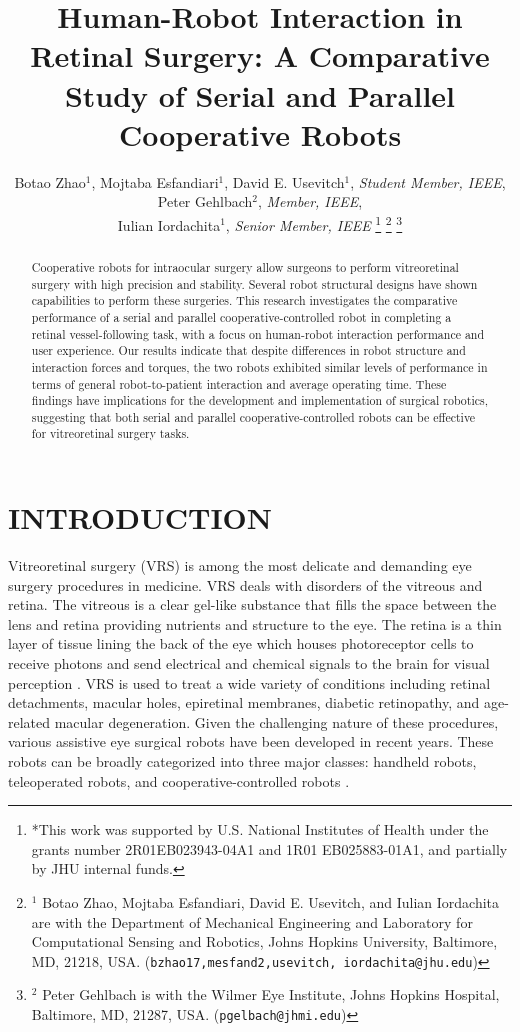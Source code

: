 \documentclass[letterpaper, 10 pt, conference]{ieeeconf}  %
\title{\LARGE \bf
Human-Robot Interaction in Retinal Surgery: A Comparative Study of Serial and Parallel Cooperative Robots
}
\author{Botao Zhao$^{1}$, 
Mojtaba Esfandiari$^{1}$,
David E. Usevitch$^{1}$, {\it Student Member, IEEE}, 
Peter Gehlbach$^{2}$, {\it Member, IEEE},  
\\Iulian Iordachita$^{1}$, {\it Senior Member, IEEE}%
\thanks{*This work was supported by U.S. National Institutes of Health under the grants number 2R01EB023943-04A1 and 1R01 EB025883-01A1, and partially by JHU internal funds.}%
\thanks{$^{1}$ Botao Zhao, Mojtaba Esfandiari, David E. Usevitch, and Iulian Iordachita are with the Department of Mechanical Engineering and Laboratory for Computational Sensing and Robotics, Johns Hopkins University,
Baltimore, MD, 21218, USA. 
        ({\tt\small bzhao17,mesfand2,usevitch, iordachita@jhu.edu})}%
\thanks{$^{2}$ Peter Gehlbach is with the Wilmer Eye Institute, Johns Hopkins Hospital, Baltimore, MD, 21287, USA. ({\tt\small pgelbach@jhmi.edu})
}
}
\begin{document}
\maketitle
\thispagestyle{empty}
\pagestyle{empty}


\begin{abstract}

Cooperative robots for intraocular surgery allow surgeons to perform vitreoretinal surgery with high precision and stability. Several robot structural designs have shown capabilities to perform these surgeries.
This research investigates the comparative performance of a serial and parallel cooperative-controlled robot in completing a retinal vessel-following task, with a focus on human-robot interaction performance and user experience.
Our results indicate that despite differences in robot structure and interaction forces and torques, the two robots exhibited similar levels of performance in terms of general robot-to-patient interaction and average operating time. These findings have implications for the development and implementation of surgical robotics, suggesting that both serial and parallel cooperative-controlled robots can be effective for vitreoretinal surgery tasks.

\end{abstract}



\section{INTRODUCTION}
Vitreoretinal surgery (VRS) is among the most delicate and demanding eye surgery procedures in medicine. VRS deals with disorders of the vitreous and retina. The vitreous is a clear gel-like substance that fills the space between the lens and retina providing nutrients and structure to the eye. The retina is a thin layer of tissue lining the back of the eye which houses photoreceptor cells to receive photons and send electrical and chemical signals to the brain for visual perception \cite{Nguyen2023}.
VRS is used to treat a wide variety of conditions including retinal detachments, macular holes, epiretinal membranes, diabetic retinopathy, and age-related macular degeneration.
Given the challenging nature of these procedures, various assistive eye surgical robots have been developed in recent years. These robots can be broadly categorized into three major classes: handheld robots, teleoperated robots, and cooperative-controlled robots \cite{vander2020robotic}.
\end{document}
